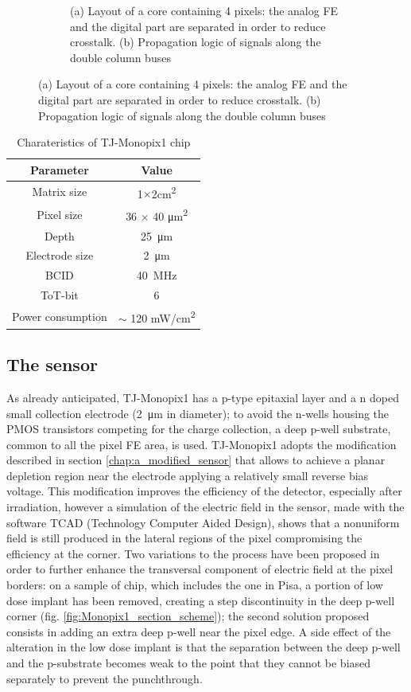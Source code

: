 \begin{figure}[h!]
\begin{subfigure}{.5\textwidth}
    \caption{(a) Layout of a core containing 4 pixels: the analog FE and the digital part are separated in order to reduce crosstalk. (b) Propagation logic of signals along the double column buses}
    \label{fig:column_order}
    \end{subfigure}
\end{figure}

\begin{table}
    \begin{center}
    \begin{tabular}{| c |c |}
    \hline
    Parameter & Value\\
    \hline
    \hline
    Matrix size &  1$\times$2\si{cm\squared}\\
    Pixel size & 36 $\times$ 40 \si{\um\squared}\\
    Depth & \SI{25}{\um}\\
    Electrode size & \SI{2}{\um}\\
    BCID & \SI{40}{MHz} \\
    ToT-bit & 6 \\
    Power consumption & $\sim$ 120 \si{mW/cm\squared}\\    
    \hline
    \end{tabular}
    \caption{Charateristics of TJ-Monopix1 chip}
    \label{tab:LF-TJ-Monopix}
    \end{center}
\end{table}


\subsection{The sensor}\label{chapter:TJMonopix1_thesensor}
    As already anticipated, TJ-Monopix1 has a p-type epitaxial layer and a n doped small collection electrode (\SI{2}{\um} in diameter); to avoid the n-wells housing the PMOS transistors competing for the charge collection, a deep p-well substrate, common to all the pixel FE area, is used.
    TJ-Monopix1 adopts the modification described in section \ref{chap:a_modified_sensor} that allows to achieve a planar depletion region near the electrode applying a relatively small reverse bias voltage.
    This modification improves the efficiency of the detector, especially after irradiation, however a simulation of the electric field in the sensor, made with the software TCAD (Technology Computer Aided Design), shows that a nonuniform field is still produced in the lateral regions of the pixel compromising the efficiency at the corner.
    Two variations to the process have been proposed in order to further enhance the transversal component of electric field at the pixel borders: on a sample of chip, which includes the one in Pisa, a portion of low dose implant has been removed, creating a step discontinuity in the deep p-well corner (fig. \ref{fig:Monopix1_section_scheme}); the second solution proposed\cite{MOUSTAKAS THESYS, PAG 58} consists in adding an extra deep p-well near the pixel edge.
    A side effect of the alteration in the low dose implant is that the separation between the deep p-well and the p-substrate becomes weak to the point that they cannot be biased separately to prevent the punchthrough. 

